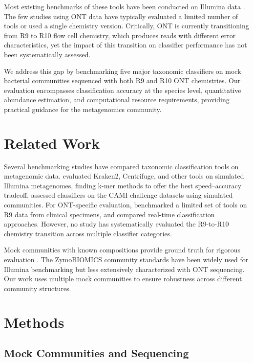 \documentclass[11pt]{article}
\begin{document}
Most existing benchmarks of these tools have been conducted on Illumina data \citep{ye2019,mcintyre2017}. The few studies using ONT data have typically evaluated a limited number of tools or used a single chemistry version. Critically, ONT is currently transitioning from R9 to R10 flow cell chemistry, which produces reads with different error characteristics, yet the impact of this transition on classifier performance has not been systematically assessed.

We address this gap by benchmarking five major taxonomic classifiers on mock bacterial communities sequenced with both R9 and R10 ONT chemistries. Our evaluation encompasses classification accuracy at the species level, quantitative abundance estimation, and computational resource requirements, providing practical guidance for the metagenomics community.

\section{Related Work}

Several benchmarking studies have compared taxonomic classification tools on metagenomic data. \citet{ye2019} evaluated Kraken2, Centrifuge, and other tools on simulated Illumina metagenomes, finding k-mer methods to offer the best speed--accuracy tradeoff. \citet{mcintyre2017} assessed classifiers on the CAMI challenge datasets using simulated communities. For ONT-specific evaluation, \citet{sanderson2018} benchmarked a limited set of tools on R9 data from clinical specimens, and \citet{chahng2022} compared real-time classification approaches. However, no study has systematically evaluated the R9-to-R10 chemistry transition across multiple classifier categories.

Mock communities with known compositions provide ground truth for rigorous evaluation \citep{sevim2019}. The ZymoBIOMICS community standards have been widely used for Illumina benchmarking but less extensively characterized with ONT sequencing. Our work uses multiple mock communities to ensure robustness across different community structures.

\section{Methods}

\subsection{Mock Communities and Sequencing}
\end{document}
